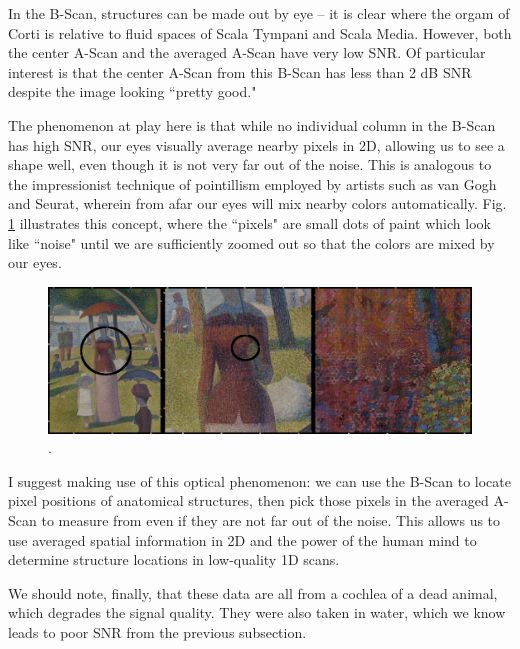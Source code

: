 \documentclass{article}
\begin{document}
\par{In the B-Scan, structures can be made out by eye -- it is clear where the orgam of Corti is relative to fluid spaces of Scala Tympani and Scala Media. However, both the center A-Scan and the averaged A-Scan have very low SNR. Of particular interest is that the center A-Scan from this B-Scan has less than 2 dB SNR despite the image looking ``pretty good."}

\par{The phenomenon at play here is that while no individual column in the B-Scan has high SNR, our eyes visually average nearby pixels in 2D, allowing us to see a shape well, even though it is not very far out of the noise. This is analogous to the impressionist technique of pointillism employed by artists such as van Gogh and Seurat, wherein from afar our eyes will mix nearby colors automatically. Fig. \ref{seurat} illustrates this concept, where the ``pixels" are small dots of paint which look like ``noise" until we are sufficiently zoomed out so that the colors are mixed by our eyes.}

\begin{figure}[h!]\label{seurat}
	\centering
	\includegraphics[width=\textwidth]{Data for Probe Writeup/seurat.png}
	\caption{.}
\end{figure}

\par{I suggest making use of this optical phenomenon: we can use the B-Scan to locate pixel positions of anatomical structures, then pick those pixels in the averaged A-Scan to measure from even if they are not far out of the noise. This allows us to use averaged spatial information in 2D and the power of the human mind to determine structure locations in low-quality 1D scans.}

\par{We should note, finally, that these data are all from a cochlea of a dead animal, which degrades the signal quality. They were also taken in water, which we know leads to poor SNR from the previous subsection.}
\end{document}
